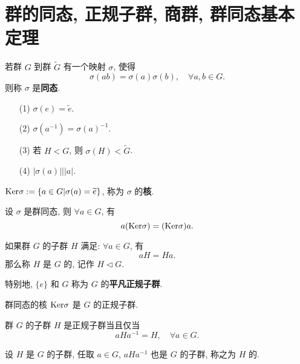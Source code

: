\section{群的同态, 正规子群, 商群, 群同态基本定理}

\begin{definition}[群同态]
	若群 $G$ 到群 $\widetilde{G}$ 有一个映射 $\sigma$, 使得 $$\sigma(ab)=\sigma(a)\sigma(b),\quad\forall a,b\in G.$$
	则称 $\sigma$ 是\textbf{同态}.
\end{definition}

\begin{property}
	\begin{itemize}
		\item[(1)] $\sigma(e)=\widetilde{e}$.
		\item[(2)] $\sigma(a^{-1})=\sigma(a)^{-1}$.
		\item[(3)] 若 $H<G$, 则 $\sigma(H)<\widetilde{G}$.
		\item[(4)] $|\sigma(a)|\big||a|$.
	\end{itemize}
\end{property}

\begin{definition}
	$\text {Ker}\sigma:=\{a\in G|\sigma(a)=\widetilde{e}\}$, 称为 $\sigma$ 的\textbf{核}.
\end{definition}

\begin{proposition}
	设 $\sigma$ 是群同态, 则 $\forall a\in G$, 有 $$a(\text {Ker}\sigma)=(\text {Ker}\sigma)a.$$
\end{proposition}

\begin{definition}
	如果群 $G$ 的子群 $H$ 满足: $\forall a\in G$, 有 $$aH=Ha.$$
	那么称 $H$ 是 $G$ 的, 记作 $H\lhd G$.

	特别地, $\{e\}$ 和 $G$ 称为 $G$ 的\textbf{平凡正规子群}.
\end{definition}

\begin{proposition}
	群同态的核 $\text {Ker}\sigma$ 是 $G$ 的正规子群.
\end{proposition}

\begin{proposition}
	群 $G$ 的子群 $H$ 是正规子群当且仅当 $$aHa^{-1}=H,\quad\forall a\in G.$$
\end{proposition}

\begin{definition}
	设 $H$ 是 $G$ 的子群, 任取 $a\in G$, $aHa^{-1}$ 也是 $G$ 的子群, 称之为 $H$ 的.
\end{definition}

